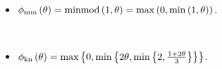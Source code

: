 \begin{frame}
\begin{examples}
\begin{columns}
\begin{column}{.48\paperwidth}
\begin{itemize}
					      \

					\item

					      \begin{math}
						      \phi_{\text{\text{mm}}}
						      \left(\theta\right)=
						      \operatorname{minmod}
						      \left(1,\theta\right)=
						      \max
						      \left(
						      0,
						      \min
						      \left(
							      1,\theta
							      \right)
						      \right)
					      \end{math}.

					      \

					\item

					      \begin{math}
						      \phi_{\text{\text{kn}}}
						      \left(\theta\right)=
						      \max
						      \left\{
						      0,
						      \min
						      \left\{
						      2\theta,
						      \min
						      \left\{
						      2,
						      \frac{1+2\theta}{3}
						      \right\}
						      \right\}
						      \right\}
					      \end{math}.
				\end{itemize}
			\end{column}
		\end{columns}
	\end{examples}
\end{frame}

